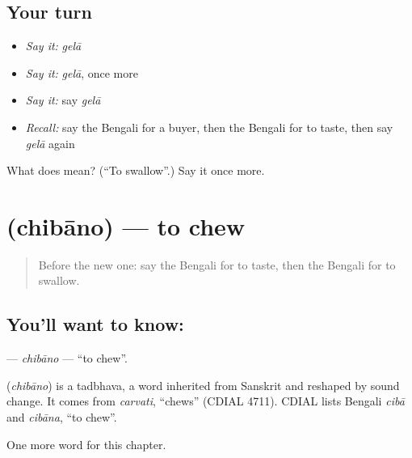 \subsection*{Your turn}
\begin{itemize}
\raggedright
  \item \emph{Say it:} \emph{gelā}
  \item \emph{Say it:} \emph{gelā}, once more
  \item \emph{Say it:} say \emph{gelā}
  \item \emph{Recall:} say the Bengali for a buyer, then the Bengali for to taste, then say \emph{gelā} again
\end{itemize}

\begin{tcolorbox}[breakable,colback=teal!4,colframe=teal!35!black,title={Before you move on}]
What does  mean? (\textquotedblleft{}To swallow\textquotedblright{}.) Say it once more.
\end{tcolorbox}
\section[\texorpdfstring{\bn{চিবানো} (chibāno)}{চিবানো (chibāno)}]{ (chibāno) — to chew}

\label{lesson:BN-C179-chibano}



\begin{quote}
Before the new one: say the Bengali for to taste, then the Bengali for to swallow.
\end{quote}

\subsection*{You'll want to know: }
\textbf{} — \emph{chibāno} — \textquotedblleft{}to chew\textquotedblright{}.

\begin{cousinweb}
\textbf{} (\emph{chibāno}) is a tadbhava, a word inherited from Sanskrit and reshaped by sound change. It comes from \emph{carvati}, \textquotedblleft{}chews\textquotedblright{} (CDIAL 4711). CDIAL lists Bengali \emph{cibā} and \emph{cibāna}, \textquotedblleft{}to chew\textquotedblright{}.
\end{cousinweb}

\begin{grammarlens}[title={What you've built}]
One more word for this chapter.
\end{grammarlens}

